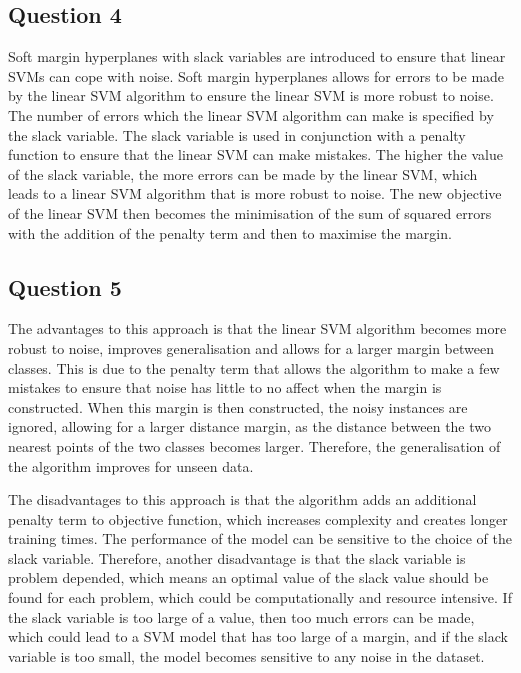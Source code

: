 \documentclass[10pt]{article}
\begin{document}
\subsection*{Question 4}

Soft margin hyperplanes with slack variables are introduced to ensure that linear SVMs can cope with noise.
Soft margin hyperplanes allows for errors to be made by the linear SVM algorithm to ensure the linear
SVM is more robust to noise. The number of errors which the linear SVM algorithm can make is specified
by the slack variable. The slack variable is used in conjunction with a penalty function to ensure that
the linear SVM can make mistakes. The higher the value of the slack variable, the more errors can be made by the
linear SVM, which leads to a linear SVM algorithm that is more robust to noise. The new objective of the linear SVM then becomes
the minimisation of the sum of squared errors with the addition of the penalty term and then to maximise the margin.

\subsection*{Question 5}

The advantages to this approach is that the linear SVM algorithm becomes more robust to noise,
improves generalisation and allows for a larger margin between classes. This is due to the penalty term
that allows the algorithm to make a few mistakes to ensure that noise has little to no affect when the
margin is constructed. When this margin is then constructed, the noisy instances are ignored, allowing
for a larger distance margin, as the distance between the two nearest points of the two classes becomes
larger. Therefore, the generalisation of the algorithm improves for unseen data.

The disadvantages to this approach is that the algorithm adds an additional penalty term
to objective function, which increases complexity and creates longer training times.
The performance of the model can be sensitive to the choice of the slack variable. Therefore, another disadvantage
is that the slack variable is problem depended, which means an optimal value of the slack value should
be found for each problem, which could be computationally and resource intensive. If the slack variable
is too large of a value, then too much errors can be made, which could lead to a SVM model that has
too large of a margin, and if the slack variable is too small, the model becomes sensitive
to any noise in the dataset.
\end{document}
